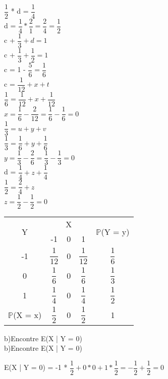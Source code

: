 \documentclass[12pt,a4paper]{article}
\begin{document}
\begin{center}
	\vspace{0.25cm}\\
	$\dfrac{1}{2}$ * d = $\dfrac{1}{4}$
	\vspace{0.25cm}\\
	d = $\dfrac{1}{4} * \dfrac{2}{1} = \dfrac{2}{4} = \dfrac{1}{2}$
	\vspace{1cm}\\
	c + $\dfrac{1}{3} + d = 1$
	\vspace{0.25cm}\\
	c + $\dfrac{1}{3} + \dfrac{1}{2} = 1$
	\vspace{0.25cm}\\
	c = 1 - $\dfrac{5}{6} = \dfrac{1}{6}$
	\vspace{1cm}\\
	c = $\dfrac{1}{12} + x + t$
	\vspace{0.25cm}\\
	$\dfrac{1}{6} = \dfrac{1}{12} + x + \dfrac{1}{12}$
	\vspace{0.25cm}\\
	$x= \dfrac{1}{6} - \dfrac{2}{12} = \dfrac{1}{6} - \dfrac{1}{6} = 0$
	\vspace{1cm}\\
	$\dfrac{1}{3} = u + y + v$
	\vspace{0.25cm}\\
	$\dfrac{1}{3} = \dfrac{1}{6} + y + \dfrac{1}{6}$
	\vspace{0.25cm}\\
	$y= \dfrac{1}{3} - \dfrac{2}{6} = \dfrac{1}{3} - \dfrac{1}{3} = 0$
	\vspace{1cm}\\
	d = $\dfrac{1}{4} + z + \dfrac{1}{4}$
	\vspace{0.25cm}\\
	$\dfrac{1}{2} = \dfrac{2}{4} + z$
	\vspace{0.25cm}\\
	$z = \dfrac{1}{2} - \dfrac{1}{2} = 0$
	\vspace{1cm}\\
	\begin{tabular}{|c|c|c|c|c|} \hline
		\multirow{2}{*}{Y} & \multicolumn{3}{c|}{X} & \multirow{2}{*}{$\mathbb{P}$(Y = y)}\\ \cline{2-4}
		& -1 & 0 & 1 & \\ \hline
		-1 & $\dfrac{1}{12}$ & 0 & $\dfrac{1}{12}$ & $\dfrac{1}{6}$\\ \hline
		0 & $\dfrac{1}{6}$ & 0 & $\dfrac{1}{6}$ & $\dfrac{1}{3}$\\ \hline
		1 & $\dfrac{1}{4}$ & 0 & $\dfrac{1}{4}$ & $\dfrac{1}{2}$\\ \hline
		$\mathbb{P}$(X = x) & $\dfrac{1}{2}$ & 0 & $\dfrac{1}{2}$ & 1\\ \hline
	\end{tabular}
\end{center}
\vspace{1cm}
b)Encontre E(X | Y = 0)
\vspace{1cm}\\
b)Encontre E(X | Y = 0)
\vspace{1cm}\\
\begin{center}
	E(X | Y = 0) = -1 * $\dfrac{1}{2} + 0 * 0 + 1 *\dfrac{1}{2} = - \dfrac{1}{2} + \dfrac{1}{2} = 0$
\end{center}
\end{document}
